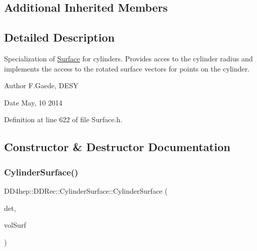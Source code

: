 \subsection*{Additional Inherited Members}


\subsection{Detailed Description}
Specialization of \hyperlink{class_d_d4hep_1_1_d_d_rec_1_1_surface}{Surface} for cylinders. Provides acces to the cylinder radius and implements the access to the rotated surface vectors for points on the cylinder. \begin{DoxyAuthor}{Author}
F.\+Gaede, D\+E\+SY 
\end{DoxyAuthor}
\begin{DoxyDate}{Date}
May, 10 2014 
\end{DoxyDate}


Definition at line 622 of file Surface.\+h.



\subsection{Constructor \& Destructor Documentation}
\hypertarget{class_d_d4hep_1_1_d_d_rec_1_1_cylinder_surface_a7820d49bdd82fe0e4c33dfa3953cd73a}{}\label{class_d_d4hep_1_1_d_d_rec_1_1_cylinder_surface_a7820d49bdd82fe0e4c33dfa3953cd73a} 
\subsubsection{\texorpdfstring{Cylinder\+Surface()}{CylinderSurface()}}
{\footnotesize\ttfamily D\+D4hep\+::\+D\+D\+Rec\+::\+Cylinder\+Surface\+::\+Cylinder\+Surface (\begin{DoxyParamCaption}\item[{\hyperlink{class_d_d4hep_1_1_geometry_1_1_det_element}{Geometry\+::\+Det\+Element}}]{det,  }\item[{\hyperlink{class_d_d4hep_1_1_d_d_rec_1_1_vol_surface}{Vol\+Surface}}]{vol\+Surf }\end{DoxyParamCaption})\hspace{0.3cm}{\ttfamily [inline]}}



